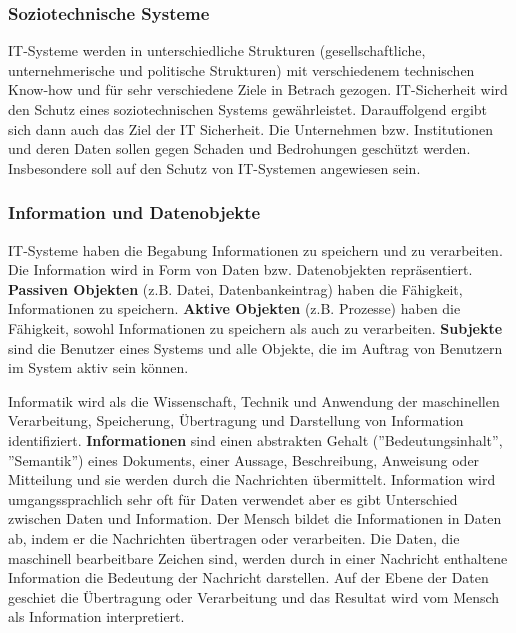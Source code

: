 \subsubsection{Soziotechnische Systeme}

IT-Systeme werden in unterschiedliche Strukturen (gesellschaftliche, unternehmerische und politische Strukturen) mit verschiedenem technischen Know-how und für sehr verschiedene Ziele in Betrach gezogen\cite[23]{eckert2013sicherheit}. IT-Sicherheit wird den Schutz eines soziotechnischen Systems gewährleistet. Darauffolgend ergibt sich dann auch das Ziel der IT Sicherheit. Die Unternehmen bzw. Institutionen und deren Daten sollen gegen Schaden und Bedrohungen geschützt werden. Insbesondere soll auf den Schutz von IT-Systemen angewiesen sein\cite{so18tech}. 

\subsubsection{Information und Datenobjekte}

IT-Systeme haben die Begabung Informationen zu speichern und zu verarbeiten. Die Information wird in Form von Daten bzw. Datenobjekten repräsentiert. \textbf{Passiven Objekten} (z.B. Datei, Datenbankeintrag) haben die Fähigkeit, Informationen zu speichern. \textbf{Aktive Objekten} (z.B. Prozesse) haben die Fähigkeit, sowohl Informationen zu speichern als auch zu verarbeiten\cite[23]{eckert2013sicherheit}.  \textbf{Subjekte} sind die Benutzer eines Systems und alle Objekte, die im Auftrag von Benutzern im System aktiv sein können\cite[24]{eckert2013sicherheit}. 

Informatik wird als die Wissenschaft, Technik und Anwendung der maschinellen Verarbeitung, Speicherung, Übertragung und Darstellung von Information identifiziert. \textbf{Informationen} sind einen abstrakten Gehalt (''Bedeutungsinhalt'', ''Semantik'') eines Dokuments, einer Aussage, Beschreibung, Anweisung oder Mitteilung\cite[5]{broy2013informatik} und sie werden durch die Nachrichten übermittelt\cite[18]{blieberger2013informatik}. Information wird umgangssprachlich sehr oft für Daten verwendet aber es gibt Unterschied zwischen Daten und Information. Der Mensch bildet die Informationen in Daten ab, indem er die Nachrichten übertragen oder verarbeiten. Die Daten, die maschinell bearbeitbare Zeichen sind, werden durch in einer Nachricht enthaltene Information die Bedeutung der Nachricht darstellen. Auf der Ebene der Daten geschiet die Übertragung oder Verarbeitung und das Resultat wird vom Mensch als Information interpretiert\cite{infstd}.

